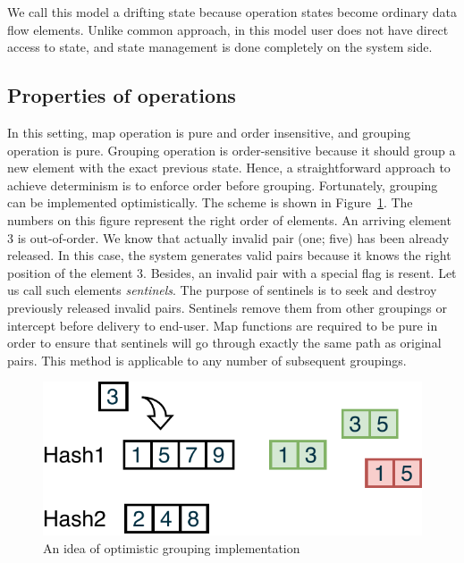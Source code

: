 We call this model a drifting state because operation states become ordinary data flow elements. Unlike common approach, in this model user does not have direct access to state, and state management is done completely on the system side.

\subsection{Properties of operations}

In this setting, map operation is pure and order insensitive, and grouping operation is pure. Grouping operation is order-sensitive because it should group a new element with the exact previous state. Hence, a straightforward approach to achieve determinism is to enforce order before grouping. Fortunately, grouping can be implemented optimistically. The scheme is shown in Figure~\ref{optimistic-grouping}. The numbers on this figure represent the right order of elements. An arriving element 3 is out-of-order. We know that actually invalid pair (one; five) has been already released. In this case, the system generates valid pairs because it knows the right position of the element 3. Besides, an invalid pair with a special flag is resent. Let us call such elements {\em sentinels}. The purpose of sentinels is to seek and destroy previously released invalid pairs. Sentinels remove them from other groupings or intercept before delivery to end-user. Map functions are required to be pure in order to ensure that sentinels will go through exactly the same path as original pairs. This method is applicable to any number of subsequent groupings.
 
\begin{figure}[htbp]
  \centering
  \includegraphics[width=.35\textwidth]{pics/grouping-invalidation}
  \caption{An idea of optimistic grouping implementation}
  \label {optimistic-grouping}
\end{figure} 
 

